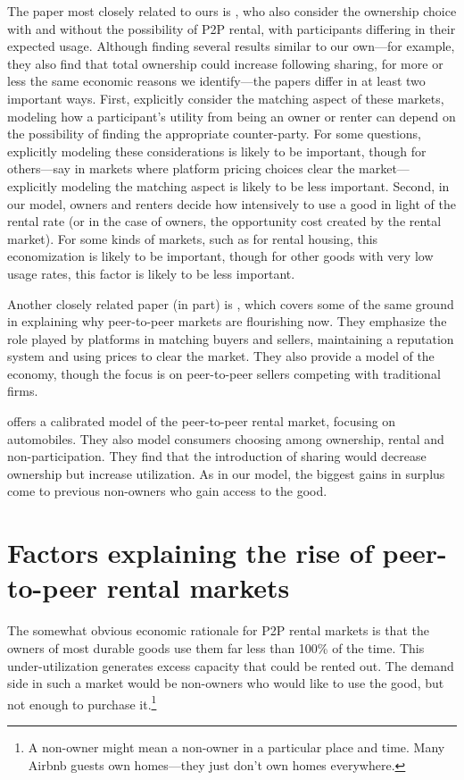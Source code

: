 \documentclass[11pt]{article}
\begin{document}
The paper most closely related to ours is \cite{benjaafar2015peer},
who also consider the ownership choice with and without the possibility of P2P rental, with participants differing in their expected usage. 
Although finding several results similar to our own---for example, they also find that total ownership could increase following sharing, for more or less the same economic reasons we identify---the papers differ in at least two important ways.
First, \citeauthor{benjaafar2015peer} explicitly consider the matching aspect of these markets, modeling how a participant's utility from being an owner or renter can depend on the possibility of finding the appropriate counter-party.
For some questions, explicitly modeling these considerations is likely to be important, though for others---say in markets where platform pricing choices clear the market---explicitly modeling the matching aspect is likely to be less important. 
Second, in our model, owners and renters decide how intensively to use a good in light of the rental rate (or in the case of owners, the opportunity cost created by the rental market).
For some kinds of markets, such as for rental housing, this economization is likely to be important, though for other goods with very low usage rates, this factor is likely to be less important. 

Another closely related paper (in part) is \cite{einav2015peer}, which covers some of the same ground in explaining why peer-to-peer markets are flourishing now.
They emphasize the role played by platforms in matching buyers and sellers, maintaining a reputation system and using prices to clear the market.
They also provide a model of the economy, though the focus is on peer-to-peer sellers competing with traditional firms. 

\cite{frailberger2015} offers a calibrated model of the peer-to-peer rental market, focusing on automobiles.
They also model consumers choosing among ownership, rental and non-participation.
They find that the introduction of sharing would decrease ownership but increase utilization.
As in our model, the biggest gains in surplus come to previous non-owners who gain access to the good. 

\section{Factors explaining the rise of peer-to-peer rental markets}

The somewhat obvious economic rationale for P2P rental markets is that the owners of most durable goods use them far less than 100\% of the time.
This under-utilization generates excess capacity that could be rented out.
The demand side in such a market would be non-owners who would like to use the good, but not enough to purchase it.\footnote{
A non-owner might mean a non-owner in a particular place and time. 
Many Airbnb guests own homes---they just don't own homes everywhere. 
} 
\end{document}
